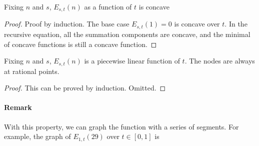 \documentclass[]{article}
\begin{document}
\vspace{1cm}
\begin{lemma}[$s,t$-concavity]
Fixing $n$ and $s$, $E_{s,t}(n)$ as a function of $t$ is concave
\end{lemma}
\begin{proof}
Proof by induction. The base case $E_{s,t}(1) = 0$ is concave over $t$. In the recursive equation, all the summation components are concave, and the minimal of concave functions is still a concave function.
\end{proof}

\vspace{1cm}
\begin{lemma}[$s,t$-linearity]
Fixing $n$ and $s$, $E_{s,t}(n)$ is a piecewise linear function of $t$. The nodes are always at rational points.
\end{lemma}
\begin{proof}
	This can be proved by induction. Omitted.
\end{proof}

\paragraph{Remark}
With this property, we can graph the function with a series of segments. For example, the graph of $E_{1,t}(29)$ over $t\in[0,1]$ is
\end{document}
